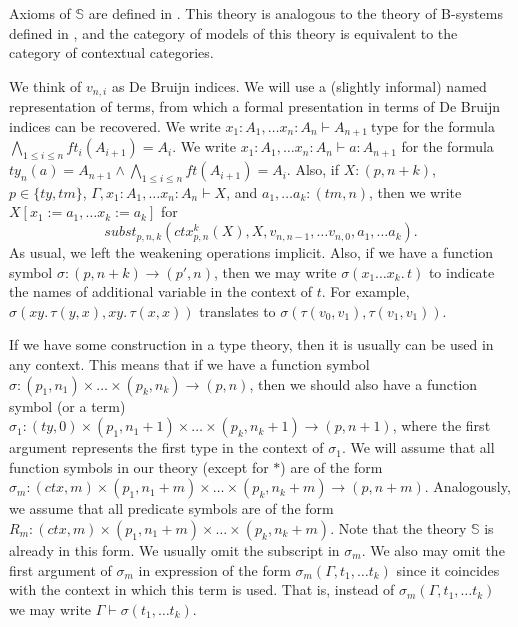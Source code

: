 \documentclass{mscs}
\newcommand{\repl}{:=}
\newcommand{\subst}{\mathit{subst}}
\newcommand{\emptyCtx}{*}
\newcommand{\substTh}{\mathbb{S}}
\newcommand{\type}{\mathrm{type}}
\numberwithin{figure}{section}
\begin{document}
Axioms of $\substTh$ are defined in \cite{alg-tt}.
This theory is analogous to the theory of B-systems defined in \cite{b-systems},
and the category of models of this theory is equivalent to the category of contextual categories.

We think of $v_{n,i}$ as De Bruijn indices.
We will use a (slightly informal) named representation of terms,
from which a formal presentation in terms of De Bruijn indices can be recovered.
We write $x_1 : A_1, \ldots x_n : A_n \vdash A_{n+1}\ \type$ for the formula $\bigwedge_{1 \leq i \leq n} ft_i(A_{i+1}) = A_i$.
We write $x_1 : A_1, \ldots x_n : A_n \vdash a : A_{n+1}$ for the formula $ty_n(a) = A_{n+1} \land \bigwedge_{1 \leq i \leq n} ft(A_{i+1}) = A_i$.
Also, if $X : (p,n+k)$, $p \in \{ ty, tm \}$, $\Gamma, x_1 : A_1, \ldots x_n : A_n \vdash X$, and $a_1, \ldots a_k : (tm,n)$,
then we write $X[x_1 \repl a_1, \ldots x_k \repl a_k]$ for
\[ \subst_{p,n,k}(ctx^k_{p,n}(X), X, v_{n,n-1}, \ldots v_{n,0}, a_1, \ldots a_k). \]
As usual, we left the weakening operations implicit.
Also, if we have a function symbol $\sigma : (p,n+k) \to (p',n)$, then we may write $\sigma(x_1 \ldots x_k.\,t)$ to indicate the names of additional variable in the context of $t$.
For example, $\sigma(x y.\,\tau(y,x), x y.\,\tau(x,x))$ translates to $\sigma(\tau(v_0,v_1), \tau(v_1,v_1))$.

If we have some construction in a type theory, then it is usually can be used in any context.
This means that if we have a function symbol $\sigma : (p_1,n_1) \times \ldots \times (p_k,n_k) \to (p,n)$,
then we should also have a function symbol (or a term) $\sigma_1 : (ty,0) \times (p_1,n_1+1) \times \ldots \times (p_k,n_k+1) \to (p,n+1)$,
where the first argument represents the first type in the context of $\sigma_1$.
We will assume that all function symbols in our theory (except for $\emptyCtx$) are of the form $\sigma_m : (ctx,m) \times (p_1,n_1+m) \times \ldots \times (p_k,n_k+m) \to (p,n+m)$.
Analogously, we assume that all predicate symbols are of the form $R_m : (ctx,m) \times (p_1,n_1+m) \times \ldots \times (p_k,n_k+m)$.
Note that the theory $\substTh$ is already in this form.
We usually omit the subscript in $\sigma_m$.
We also may omit the first argument of $\sigma_m$ in expression of the form $\sigma_m(\Gamma, t_1, \ldots t_k)$ since it coincides with the context in which this term is used.
That is, instead of $\sigma_m(\Gamma, t_1, \ldots t_k)$ we may write $\Gamma \vdash \sigma(t_1, \ldots t_k)$.
\end{document}
